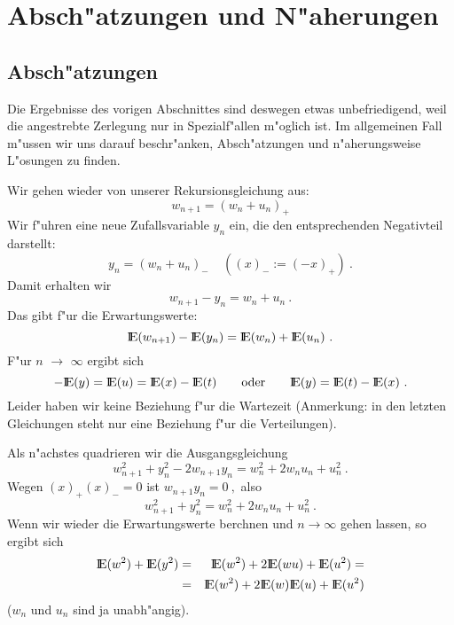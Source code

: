 
\chapter{Absch"atzungen und N"aherungen}
\section{Absch"atzungen}
Die Ergebnisse des vorigen Abschnittes sind deswegen etwas unbefriedigend, weil die angestrebte Zerlegung nur in 
Spezialf"allen m"oglich ist. Im allgemeinen Fall m"ussen wir uns darauf beschr"anken, Absch"atzungen und
n"aherungsweise L"osungen zu finden.

Wir gehen wieder von unserer Rekursionsgleichung aus:
\[w_{n+1} = (w_{n}+u_{n})_{+} \]
Wir f"uhren eine neue Zufallsvariable $y_{n}$ ein, die den entsprechenden Negativteil darstellt:
\[y_{n} = (w_{n}+u_{n})_{-}  ~ ~ ~ ~ ~ ((x)_{-} := (-x)_{+}) ~. \]
Damit erhalten wir
\[ w_{n+1}-y_{n} = w_{n}+u_{n} ~.\]
Das gibt f"ur die Erwartungswerte:
\[{\rm I\kern-0.2em E}(w_{n+1})-{\rm I\kern-0.2em E}(y_{n}) = {\rm I\kern-0.2em E}(w_{n})+{\rm I\kern-0.2em E}(u_{n}) ~.\]
F"ur $n$ $\rightarrow$ $\infty$ ergibt sich
\[-{\rm I\kern-0.2em E}(y) = {\rm I\kern-0.2em E}(u) = {\rm I\kern-0.2em E}(x) - {\rm I\kern-0.2em E}(t) \qquad \mbox{oder} \qquad {\rm I\kern-0.2em E}(y) = {\rm I\kern-0.2em E}(t) - {\rm I\kern-0.2em E}(x) ~.\]
Leider haben wir keine Beziehung f"ur die Wartezeit (Anmerkung: in den letzten Gleichungen steht nur eine Beziehung f"ur die Verteilungen).

Als n"achstes quadrieren wir die Ausgangsgleichung
\[ w_{n+1}^{2}+y_{n}^{2}-2w_{n+1}y_{n}=w_{n}^{2}+2w_{n}u_{n}+u_{n}^{2} ~.\]
Wegen \( (x)_{+}(x)_{-} = 0 \)  ist \( w_{n+1}y_{n} = 0 ~,\) also
\[w_{n+1}^2 + y_{n}^2 = w_{n}^2+2w_{n}u_{n}+u_{n}^2 ~.\]
Wenn wir wieder die Erwartungswerte berchnen und \(n \rightarrow \infty \) gehen lassen, so ergibt sich
\begin{eqnarray*}
{\rm I\kern-0.2em E}(w^{2})+{\rm I\kern-0.2em E}(y^{2})&=&{\rm I\kern-0.2em E}(w^{2})+2{\rm I\kern-0.2em E}(wu)+{\rm I\kern-0.2em E}(u^{2}) = \\
                   &=&{\rm I\kern-0.2em E}(w^{2})+2{\rm I\kern-0.2em E}(w){\rm I\kern-0.2em E}(u)+{\rm I\kern-0.2em E}(u^{2}) \\
\end{eqnarray*}
($w_{n}$ und $u_{n}$ sind ja unabh"angig).

